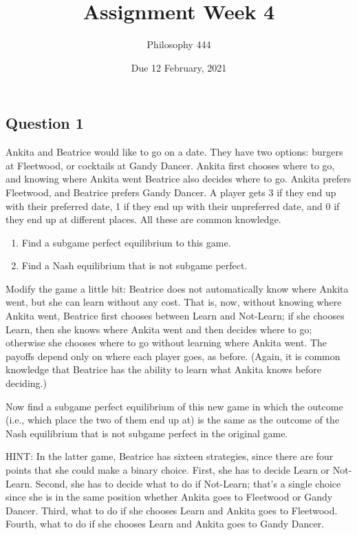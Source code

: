 \documentclass[
  11pt,
]{article}
\title{Assignment Week 4}
\author{Philosophy 444}
\date{Due 12 February, 2021}
\providecommand{\tightlist}{%
  \setlength{\itemsep}{0pt}\setlength{\parskip}{0pt}}
\begin{document}
\maketitle

\hypertarget{question-1}{%
\subsection{Question 1}\label{question-1}}

Ankita and Beatrice would like to go on a date. They have two options:
burgers at Fleetwood, or cocktails at Gandy Dancer. Ankita first chooses
where to go, and knowing where Ankita went Beatrice also decides where
to go. Ankita prefers Fleetwood, and Beatrice prefers Gandy Dancer. A
player gets 3 if they end up with their preferred date, 1 if they end up
with their unpreferred date, and 0 if they end up at different places.
All these are common knowledge.

\begin{enumerate}
\def\labelenumi{\alph{enumi}.}
\tightlist
\item
  Find a subgame perfect equilibrium to this game.
\item
  Find a Nash equilibrium that is not subgame perfect.
\end{enumerate}

Modify the game a little bit: Beatrice does not automatically know where
Ankita went, but she can learn without any cost. That is, now, without
knowing where Ankita went, Beatrice first chooses between Learn and
Not-Learn; if she chooses Learn, then she knows where Ankita went and
then decides where to go; otherwise she chooses where to go without
learning where Ankita went. The payoffs depend only on where each player
goes, as before. (Again, it is common knowledge that Beatrice has the
ability to learn what Ankita knows before deciding.)

Now find a subgame perfect equilibrium of this new game in which the
outcome (i.e., which place the two of them end up at) is the same as the
outcome of the Nash equilibrium that is not subgame perfect in the
original game.

HINT: In the latter game, Beatrice has sixteen strategies, since there
are four points that she could make a binary choice. First, she has to
decide Learn or Not-Learn. Second, she has to decide what to do if
Not-Learn; that's a single choice since she is in the same position
whether Ankita goes to Fleetwood or Gandy Dancer. Third, what to do if
she chooses Learn and Ankita goes to Fleetwood. Fourth, what to do if
she chooses Learn and Ankita goes to Gandy Dancer.
\end{document}
